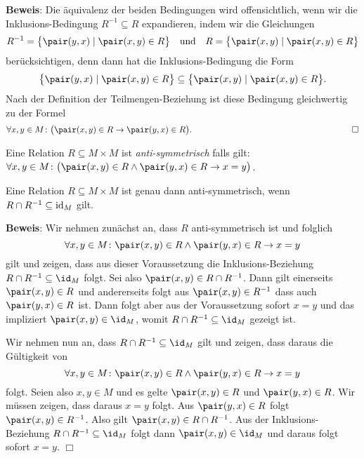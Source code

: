 \noindent
\textbf{Beweis}:
Die \"{a}quivalenz der beiden Bedingungen wird offensichtlich, wenn wir die Inklusions-Bedingung
$R^{-1} \subseteq R$ expandieren, indem wir die Gleichungen
\[ R^{-1} = \bigl\{ \pair(y,x) \mid \pair(x,y) \in R \bigr\} \quad \mbox{und} \quad
   R      = \bigl\{ \pair(x,y) \mid \pair(x,y) \in R \bigr\} \]
ber\"{u}cksichtigen, denn dann hat die Inklusions-Bedingung die Form
\[ \bigl\{ \pair(y,x) \mid \pair(x,y) \in R \bigr\} \subseteq
   \bigl\{ \pair(x,y) \mid \pair(x,y) \in R \bigr\}. \]
Nach der Definition der Teilmengen-Beziehung ist diese Bedingung gleichwertig zu der Formel
\[ \forall x, y \in M \colon \bigl(\pair(x,y) \in R \rightarrow\pair(y,x) \in R\bigr). 
   \hspace*{6.6cm} \Box \]

\begin{Definition}
Eine Relation $R \subseteq M \times M$  ist \emph{anti-symmetrisch} falls gilt: \\[0.2cm]
\hspace*{1.3cm} 
$\forall x, y \in M \colon \bigl(\pair(x,y) \in R \wedge \pair(y,x) \in R \rightarrow x = y\bigr)$.
\end{Definition}

\begin{Satz}
Eine Relation $R \subseteq M \times M$  ist genau dann anti-symmetrisch, wenn
$R \cap R^{-1} \subseteq \mbox{\rm id}_{M}$ gilt.
\end{Satz}

\noindent
\textbf{Beweis}:
Wir nehmen zun\"{a}chst an, dass $R$ anti-symmetrisch ist und folglich
\[ \forall x, y \in M \colon \pair(x,y) \in R \wedge \pair(y,x) \in R \rightarrow x = y \]
gilt und zeigen, dass aus dieser Voraussetzung die Inklusions-Beziehung
$R \cap R^{-1} \subseteq \id_{M}$ folgt.  Sei also $\pair(x,y) \in R \cap R^{-1}$.
Dann gilt einerseits $\pair(x,y) \in R$ und andererseits folgt aus $\pair(x,y) \in R^{-1}$
dass auch $\pair(y,x) \in R$ ist.  Dann folgt aber aus der Voraussetzung sofort $x=y$
und das impliziert $\pair(x,y) \in \id_M$, womit $R \cap R^{-1} \subseteq \id_{M}$ 
gezeigt ist.

Wir nehmen nun an, dass $R \cap R^{-1} \subseteq \id_{M}$ gilt und zeigen, dass daraus
die G\"{u}ltigkeit von 
\[ \forall x, y \in M \colon \pair(x,y) \in R \wedge \pair(y,x) \in R \rightarrow x = y \]
folgt.  Seien also $x,y \in M$ und es gelte $\pair(x,y) \in R$ und $\pair(y,x) \in R$.
Wir m\"{u}ssen zeigen, dass daraus $x=y$ folgt.  Aus $\pair(y,x) \in R$ folgt 
$\pair(x,y) \in R^{-1}$.  Also gilt $\pair(x,y) \in R \cap R^{-1}$.
Aus der Inklusions-Beziehung $R \cap R^{-1} \subseteq \id_{M}$ folgt dann
$\pair(x,y) \in \id_M$ und daraus folgt sofort $x = y$. \hspace*{\fill} $\Box$

